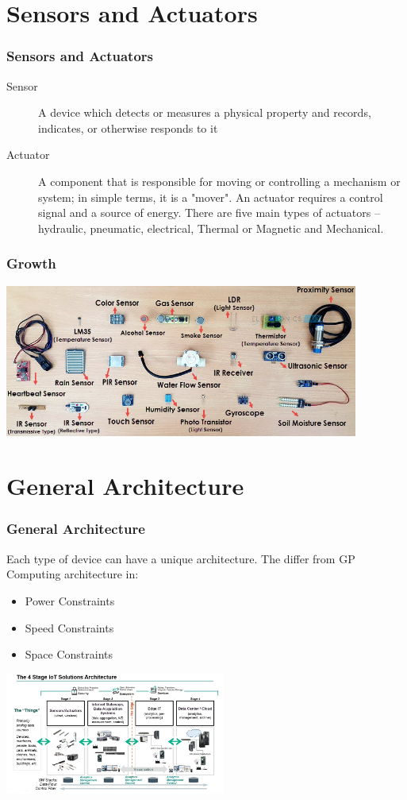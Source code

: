 \documentclass{beamer}
\begin{document}
  \section{Sensors and Actuators}
  \begin{frame}
  	\frametitle{Sensors and Actuators}
\begin{description}
	\item[Sensor]A device which detects or measures a physical property and records, indicates, or otherwise responds to it
	\item[Actuator] A component that is responsible for moving or controlling a mechanism or system; in simple terms, it is a "mover". An actuator requires a control signal and a source of energy. There are five main types of actuators – hydraulic, pneumatic, electrical, Thermal or Magnetic and Mechanical.
\end{description}


  \end{frame}
 \begin{frame}
 	\frametitle{Growth}
 	\includegraphics[height=5cm]{Types-of-Sensors.jpg}
 	
 \end{frame}
  
   \section{General Architecture}
   \begin{frame}
   	\frametitle{General Architecture}
Each type of device can have a unique architecture. The differ from GP Computing architecture in:
\begin{itemize}
	\item Power Constraints
	\item Speed Constraints
	\item Space Constraints
\end{itemize}

\includegraphics[height=4cm]{iotArchitecture.jpg}

   \end{frame}
\end{document}
